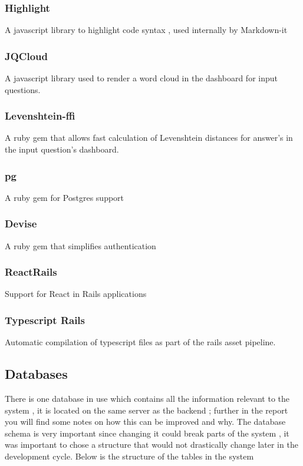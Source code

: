 \subsubsection{Highlight}
A javascript library to highlight code syntax , used internally by Markdown-it
	
\subsubsection{JQCloud}
A javascript library used to render a word cloud in the dashboard for input questions.

\subsubsection{Levenshtein-ffi}
A ruby gem that allows fast calculation of Levenshtein distances for answer's in the input question's dashboard.

\subsubsection{pg}
A ruby gem for Postgres support

\subsubsection{Devise}
A ruby gem that simplifies authentication

\subsubsection{ReactRails}
Support for React in Rails applications

\subsubsection{Typescript Rails}
Automatic compilation of typescript files as part of the rails asset pipeline.

\subsection{Databases}
There is one database in use which contains all the information relevant to the system , it is located on the same server as the backend ; further in the report you will find some notes on how this can be improved and why.
The database schema is very important since changing it could break parts of the system , it was important to chose a structure that would not drastically change later in the development cycle.
Below is the structure of the tables in the system

